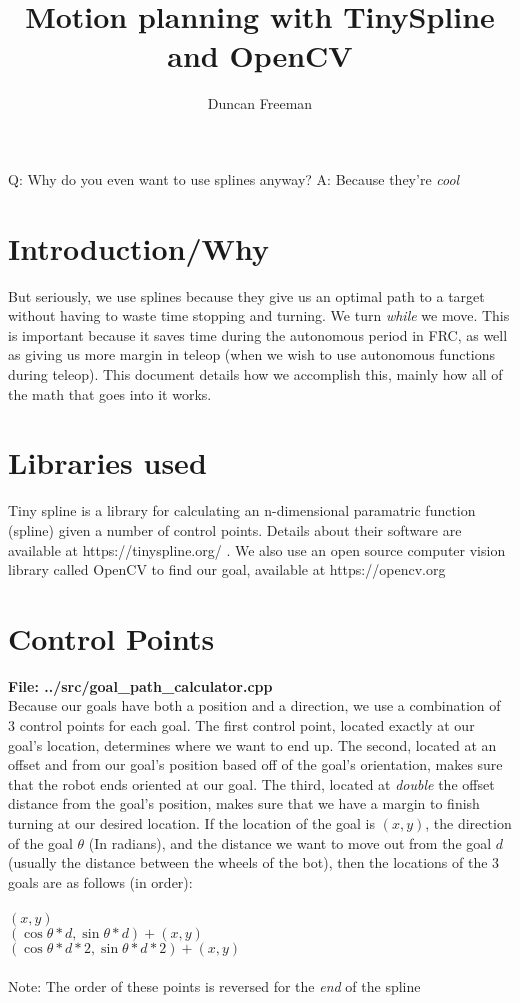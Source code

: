 \documentclass[12pt, english]{article}
\date{}
\title{ Motion planning with TinySpline and OpenCV }
\begin{document}
\author{
	Duncan Freeman
}

\maketitle

\noindent
	\bgroup\obeylines
	Q: Why do you even want to use splines anyway?
	A: Because they're \textit{cool}
	\egroup

\tableofcontents
\newpage

\section{Introduction/Why}
But seriously, we use splines because they give us an optimal path to a target without having to waste time stopping and turning. We turn \textit{while} we move. This is important because it saves time during the autonomous period in FRC, as well as giving us more margin in teleop (when we wish to use autonomous functions during teleop). This document details how we accomplish this, mainly how all of the math that goes into it works.

\section{Libraries used}
Tiny spline is a library for calculating an n-dimensional paramatric function (spline) given a number of control points. Details about their software are available at https://tinyspline.org/ . We also use an open source computer vision library called OpenCV to find our goal, available at https://opencv.org

\section{Control Points}
\textbf{File: ../src/goal\_path\_calculator.cpp} \\
Because our goals have both a position and a direction, we use a combination of 3 control points for each goal. The first control point, located exactly at our goal's location, determines where we want to end up. The second, located at an offset and from our goal's position based off of the goal's orientation, makes sure that the robot ends oriented at our goal. The third, located at \textit{double} the offset distance from the goal's position, makes sure that we have a margin to finish turning at our desired location. If the location of the goal is $(x, y)$, the direction of the goal $\theta$ (In radians), and the distance we want to move out from the goal $d$ (usually the distance between the wheels of the bot), then the locations of the 3 goals are as follows (in order): \\
\\
$(x, y)$ \\
$(\cos{\theta} * d, \sin{\theta} * d) + (x, y)$ \\
$(\cos{\theta} * d * 2, \sin{\theta} * d * 2) + (x, y)$ \\
\\
Note: The order of these points is reversed for the \textit{end} of the spline
\end{document}
